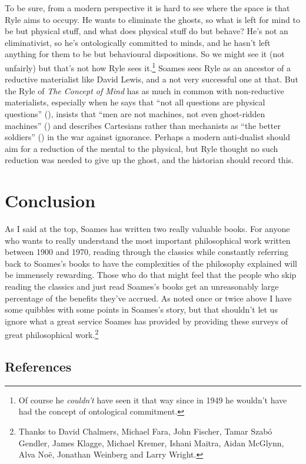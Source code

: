 \documentclass[
  10pt,
  letterpaper,
  DIV=11,
  numbers=noendperiod,
  twoside]{scrartcl}
\begin{document}
To be sure, from a modern perspective it is hard to see where the space
is that Ryle aims to occupy. He wants to eliminate the ghosts, so what
is left for mind to be but physical stuff, and what does physical stuff
do but behave? He's not an eliminativist, so he's ontologically
committed to minds, and he hasn't left anything for them to be but
behavioural dispositions. So we might see it (not unfairly) but that's
not how Ryle sees it.\footnote{Of course he \emph{couldn't} have seen it
  that way since in 1949 he wouldn't have had the concept of ontological
  commitment.} Soames sees Ryle as an ancestor of a reductive
materialist like David Lewis, and a not very successful one at that. But
the Ryle of \emph{The Concept of Mind} has as much in common with
non-reductive materialists, especially when he says that ``not all
questions are physical questions'' (),
insists that ``men are not machines, not even ghost-ridden machines''
() and describes Cartesians rather than
mechanists as ``the better soldiers'' () in the war against ignorance. Perhaps a modern anti-dualist should
aim for a reduction of the mental to the physical, but Ryle thought no
such reduction was needed to give up the ghost, and the historian should
record this.

\section{Conclusion}\label{conclusion}

As I said at the top, Soames has written two really valuable books. For
anyone who wants to really understand the most important philosophical
work written between 1900 and 1970, reading through the classics while
constantly referring back to Soames's books to have the complexities of
the philosophy explained will be immensely rewarding. Those who do that
might feel that the people who skip reading the classics and just read
Soames's books get an unreasonably large percentage of the benefits
they've accrued. As noted once or twice above I have some quibbles with
some points in Soames's story, but that shouldn't let us ignore what a
great service Soames has provided by providing these surveys of great
philosophical work.\footnote{Thanks to David Chalmers, Michael Fara,
  John Fischer, Tamar Szabó Gendler, James Klagge, Michael Kremer,
  Ishani Maitra, Aidan McGlynn, Alva Noë, Jonathan Weinberg and Larry
  Wright.}

\subsection*{References}\label{references}
\end{document}
